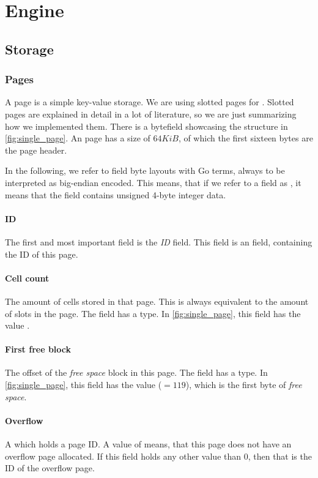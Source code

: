 \section{Engine}
\label{sec:engine}

\subsection{Storage}
\label{sec:storage}

\subsubsection{Pages}
\label{sec:pages}
A page is a simple key-value storage.
We are using slotted pages for \xdb{}.
Slotted pages are explained in detail in a lot of literature, so we are just summarizing how we implemented them.
There is a bytefield showcasing the structure in \autoref{fig:single_page}.
An \xdb{} page has a size of $64KiB$, of which the first sixteen bytes are the page header.

In the following, we refer to field byte layouts with Go terms, always to be interpreted as big-endian encoded.
This means, that if we refer to a field as , it means that the field contains unsigned 4-byte integer data.

\paragraph{ID}
The first and most important field is the \emph{ID} field.
This field is an  field, containing the ID of this page.

\paragraph{Cell count}
The amount of cells stored in that page.
This is always equivalent to the amount of slots in the page.
The field has a  type.
In \autoref{fig:single_page}, this field has the value .

\paragraph{First free block}
The offset of the \emph{free space} block in this page.
The field has a  type.
In \autoref{fig:single_page}, this field has the value  ($= 119$), which is the first byte of \emph{free space}.

\paragraph{Overflow}
A  which holds a page ID.
A value of  means, that this page does not have an overflow page allocated.
If this field holds any other value than $0$, then that is the ID of the overflow page.

